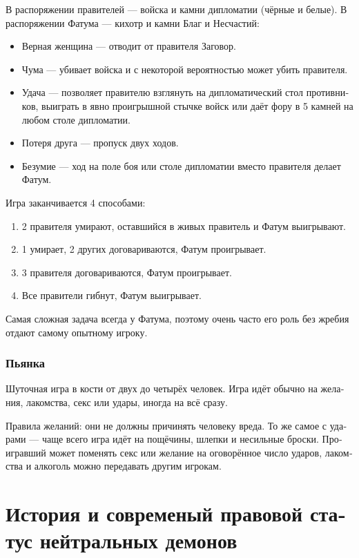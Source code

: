 \documentclass[a4paper,12pt,fleqn]{book}\usepackage{polyglossia}\setdefaultlanguage[babelshorthands=true]{russian}\setotherlanguage{english}\defaultfontfeatures{Ligatures=TeX,Mapping=tex-text}\usepackage{xcolor}\newcommand{\ml}[3]{#2}
\begin{document}
{В распоряжении правителей --- войска и камни дипломатии (чёрные и белые).
В распоряжении Фатума --- кихотр и камни Благ и Несчастий:

\begin{itemize}
\item Верная женщина --- отводит от правителя Заговор.
\item Чума --- убивает войска и с некоторой вероятностью может убить правителя.
\item Удача --- позволяет правителю взглянуть на дипломатический стол противников, выиграть в явно проигрышной стычке войск или даёт фору в 5 камней на любом столе
дипломатии.
\item Потеря друга --- пропуск двух ходов.
\item Безумие --- ход на поле боя или столе дипломатии вместо правителя делает Фатум.
\end{itemize}

Игра заканчивается 4 способами:

\begin{enumerate}
\item 2 правителя умирают, оставшийся в живых правитель и Фатум выигрывают.
\item 1 умирает, 2 других договариваются, Фатум проигрывает.
\item 3 правителя договариваются, Фатум проигрывает.
\item Все правители гибнут, Фатум выигрывает.
\end{enumerate}

Самая сложная задача всегда у Фатума, поэтому очень часто его роль без жребия отдают самому опытному игроку.

\subsection{Пьянка}

Шуточная игра в кости от двух до четырёх человек.
Игра идёт обычно на желания, лакомства, секс или удары, иногда на всё сразу.

Правила желаний: они не должны причинять человеку вреда.
То же самое с ударами --- чаще всего игра идёт на пощёчины, шлепки и несильные броски.
Проигравший может поменять секс или желание на оговорённое число ударов, лакомства и алкоголь можно передавать другим игрокам.

\chapter{История и современый правовой статус нейтральных демонов}

}
\end{document}
